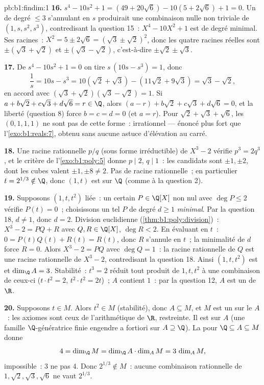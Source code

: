 \begin{solution}{pb:b1:findim:1}
\textbf{16.} $s^4 - 10s^2 + 1 = (49 + 20\sqrt6) - 10(5 +
2\sqrt6) + 1 = 0$. Un  de degré $\leq 3$
s'annulant en $s$ produirait une combinaison nulle non triviale de
$(1, s, s^2, s^3)$, contredisant la question 15~: $X^4 - 10X^2 + 1$
est de degré minimal. Ses racines~: $X^2 = 5 \pm 2\sqrt6 = (\sqrt3 \pm
\sqrt2)^2$, donc les quatre racines réelles sont $\pm(\sqrt3 +
\sqrt2)$ et $\pm(\sqrt3 - \sqrt2)$, c'est-à-dire $\pm\sqrt2 \pm
\sqrt3$.

\textbf{17.} De $s^4 - 10s^2 + 1 = 0$ on tire $s\,(10s - s^3) = 1$,
donc
\[
\frac1s = 10s - s^3 = 10(\sqrt2 + \sqrt3) - (11\sqrt2 + 9\sqrt3)
= \sqrt3 - \sqrt2 ,
\]
en accord avec $(\sqrt3 + \sqrt2)(\sqrt3 - \sqrt2) = 1$. Si $a +
b\sqrt2 + c\sqrt3 + d\sqrt6 = r \in \Q$, alors $(a - r) + b\sqrt2
+ c\sqrt3 + d\sqrt6 = 0$, et la liberté (question 8) force $b = c
= d = 0$ (et $a = r$). Pour $\sqrt2 + \sqrt3 + \sqrt6$, les
 $(0, 1, 1, 1)$ ne sont pas de cette forme~: irrationnel
--- énoncé plus fort que l'\cref{exo:b1:reals:7}, obtenu sans aucune
astuce d'élévation au carré.

\textbf{18.} Une racine rationnelle $p/q$ (sous forme irréductible) de
$X^3 - 2$ vérifie $p^3 = 2q^3$, et le critère de
l'\cref{exo:b1:poly:5} donne $p \mid 2$, $q \mid 1$~: les candidats
sont $\pm1, \pm2$, dont les cubes valent $\pm1, \pm8 \neq 2$. Pas de
racine rationnelle~; en particulier $t = 2^{1/3} \notin \Q$, donc
$(1, t)$ est  sur $\Q$ (comme à la question 2).

\textbf{19.} Supposons $(1, t, t^2)$ liée~: un certain $P \in
\Q[X]$ non nul avec $\deg P \leq 2$ vérifie $P(t) = 0$~; choisissons
un tel $P$ de degré $d \geq 1$ \emph{minimal}. Par la question 18, $d
\neq 1$, donc $d = 2$. Division euclidienne
(\cref{thm:b1:poly:division})~: $X^3 - 2 = PQ + R$ avec $Q, R \in
\Q[X]$, $\deg R < 2$. En évaluant en $t$~: $0 = P(t)Q(t) + R(t) =
R(t)$, donc $R$ s'annule en $t$~; la minimalité de $d$ force $R = 0$.
Alors $X^3 - 2 = PQ$ avec $\deg Q = 1$~: la racine rationnelle de $Q$
est une racine rationnelle de $X^3 - 2$, contredisant la question 18.
Ainsi $(1, t, t^2)$ est  et $\dim_\Q A = 3$. Stabilité~: $t^3 =
2$ réduit tout produit de $1, t, t^2$ à une combinaison de ceux-ci
($t\cdot t^2 = 2$, $t^2\cdot t^2 = 2t$)~; $A$ contient $1$~: par la
question 12, $A$ est un  de $\R$.

\textbf{20.} Supposons $t \in M$. Alors $t^2 \in M$ (stabilité), donc
$A \subseteq M$, et $M$ est un  sur le  $A$~:
les axiomes sont ceux de l'arithmétique de $\R$, restreinte. Il est
 sur $A$ (une famille $\Q$-génératrice finie
engendre a fortiori sur $A \supseteq \Q$). La  pour
$\Q \subseteq A \subseteq M$ donne
\[
4 = \dim_\Q M = \dim_\Q A \cdot \dim_A M = 3\,\dim_A M ,
\]
impossible~: $3$ ne  pas $4$. Donc $2^{1/3} \notin M$~: aucune
combinaison rationnelle de $1, \sqrt2, \sqrt3, \sqrt6$ ne vaut
$2^{1/3}$.


\end{solution}
